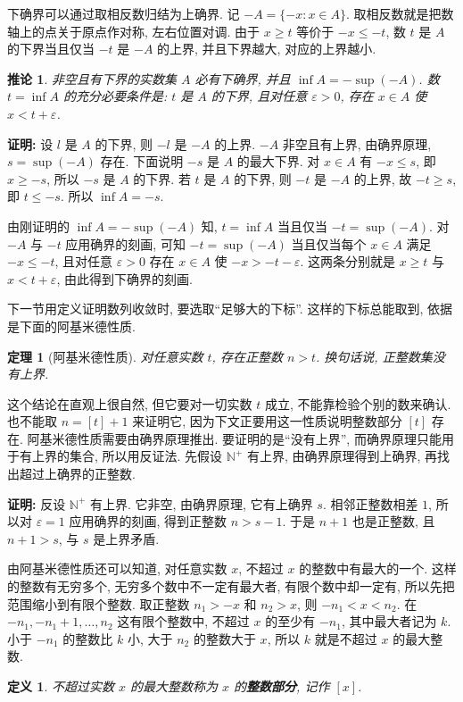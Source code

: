 \documentclass[UTF8,openany]{ctexbook}
\theoremstyle{chinesetextbook}
\newtheorem{definition}{定义}[section]
\newtheorem{theorem}{定理}[section]
\newenvironment{cnproof}{\par\indent\textbf{证明:} \ignorespaces}{\par}
\newtheorem*{corollarysingle}{推论}
\begin{document}
下确界可以通过取相反数归结为上确界. 记 $-A=\{-x:x\in A\}$. 取相反数就是把数轴上的点关于原点作对称, 左右位置对调. 由于 $x\ge t$ 等价于 $-x\le-t$, 数 $t$ 是 $A$ 的下界当且仅当 $-t$ 是 $-A$ 的上界, 并且下界越大, 对应的上界越小.
\begin{corollarysingle}
非空且有下界的实数集 $A$ 必有下确界, 并且 $\inf A=-\sup(-A)$. 数 $t=\inf A$ 的充分必要条件是: $t$ 是 $A$ 的下界, 且对任意 $\varepsilon>0$, 存在 $x\in A$ 使 $x<t+\varepsilon$.
\end{corollarysingle}
\begin{cnproof}
设 $l$ 是 $A$ 的下界, 则 $-l$ 是 $-A$ 的上界. $-A$ 非空且有上界, 由确界原理, $s=\sup(-A)$ 存在. 下面说明 $-s$ 是 $A$ 的最大下界. 对 $x\in A$ 有 $-x\le s$, 即 $x\ge-s$, 所以 $-s$ 是 $A$ 的下界. 若 $t$ 是 $A$ 的下界, 则 $-t$ 是 $-A$ 的上界, 故 $-t\ge s$, 即 $t\le-s$. 所以 $\inf A=-s$.

由刚证明的 $\inf A=-\sup(-A)$ 知, $t=\inf A$ 当且仅当 $-t=\sup(-A)$. 对 $-A$ 与 $-t$ 应用确界的刻画, 可知 $-t=\sup(-A)$ 当且仅当每个 $x\in A$ 满足 $-x\le-t$, 且对任意 $\varepsilon>0$ 存在 $x\in A$ 使 $-x>-t-\varepsilon$. 这两条分别就是 $x\ge t$ 与 $x<t+\varepsilon$, 由此得到下确界的刻画.
\end{cnproof}
下一节用定义证明数列收敛时, 要选取“足够大的下标”. 这样的下标总能取到, 依据是下面的阿基米德性质.
\begin{theorem}[阿基米德性质]
对任意实数 $t$, 存在正整数 $n>t$. 换句话说, 正整数集没有上界.
\end{theorem}
这个结论在直观上很自然, 但它要对一切实数 $t$ 成立, 不能靠检验个别的数来确认. 也不能取 $n=[t]+1$ 来证明它, 因为下文正要用这一性质说明整数部分 $[t]$ 存在. 阿基米德性质需要由确界原理推出. 要证明的是“没有上界”, 而确界原理只能用于有上界的集合, 所以用反证法. 先假设 $\mathbb N^+$ 有上界, 由确界原理得到上确界, 再找出超过上确界的正整数.
\begin{cnproof}
反设 $\mathbb N^+$ 有上界. 它非空, 由确界原理, 它有上确界 $s$. 相邻正整数相差 $1$, 所以对 $\varepsilon=1$ 应用确界的刻画, 得到正整数 $n>s-1$. 于是 $n+1$ 也是正整数, 且 $n+1>s$, 与 $s$ 是上界矛盾.
\end{cnproof}
由阿基米德性质还可以知道, 对任意实数 $x$, 不超过 $x$ 的整数中有最大的一个. 这样的整数有无穷多个, 无穷多个数中不一定有最大者, 有限个数中却一定有, 所以先把范围缩小到有限个整数. 取正整数 $n_1>-x$ 和 $n_2>x$, 则 $-n_1<x<n_2$. 在 $-n_1,-n_1+1,\ldots,n_2$ 这有限个整数中, 不超过 $x$ 的至少有 $-n_1$, 其中最大者记为 $k$. 小于 $-n_1$ 的整数比 $k$ 小, 大于 $n_2$ 的整数大于 $x$, 所以 $k$ 就是不超过 $x$ 的最大整数.
\begin{definition}
不超过实数 $x$ 的最大整数称为 $x$ 的\textbf{整数部分}, 记作 $[x]$.
\end{definition}
\end{document}
